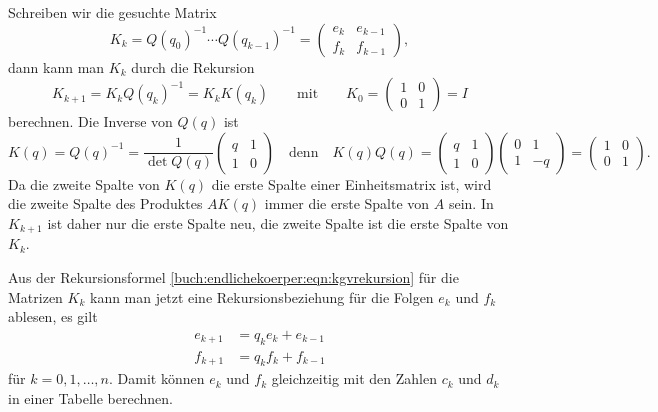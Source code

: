 Schreiben wir die gesuchte Matrix 
\[
K_k
=
Q(q_0)^{-1}\cdots Q(q_{k-1})^{-1}
=
\begin{pmatrix}
e_k & e_{k-1}\\
f_k & f_{k-1}
\end{pmatrix},
\]
dann kann man $K_k$ durch die Rekursion
\begin{equation}
K_{k+1}
=
K_{k} Q(q_k)^{-1} 
=
K_k K(q_k)
\qquad\text{mit}\qquad
K_0 = \begin{pmatrix}1&0\\0&1\end{pmatrix} = I
\label{buch:endlichekoerper:eqn:kgvrekursion}
\end{equation}
berechnen.
Die Inverse von $Q(q)$ ist
\[
K(q)
=
Q(q)^{-1}
=
\frac{1}{\det Q(q)}
\begin{pmatrix}
q&1\\
1&0
\end{pmatrix}
\quad\text{denn}\quad
K(q)Q(q)
=
\begin{pmatrix}
q&1\\
1&0
\end{pmatrix}
\begin{pmatrix}
0&1\\
1&-q
\end{pmatrix}
=
\begin{pmatrix}
1&0\\
0&1
\end{pmatrix}.
\]
Da die zweite Spalte von $K(q)$ die erste Spalte einer Einheitsmatrix
ist, wird die zweite Spalte des Produktes $AK(q)$ immer die erste Spalte
von $A$ sein.
In $K_{k+1}$ ist daher nur die erste Spalte neu, die zweite Spalte ist
die erste Spalte von $K_k$.

Aus der Rekursionsformel \eqref{buch:endlichekoerper:eqn:kgvrekursion}
für die Matrizen $K_k$ kann man jetzt eine Rekursionsbeziehung
für die Folgen $e_k$ und $f_k$ ablesen, es gilt
\begin{align*}
e_{k+1} &= q_ke_k + e_{k-1} \\
f_{k+1} &= q_kf_k + f_{k-1}
\end{align*}
für $k=0,1,\dots ,n$.
Damit können $e_k$ und $f_k$ gleichzeitig mit den Zahlen $c_k$ und $d_k$
in einer Tabelle berechnen.

